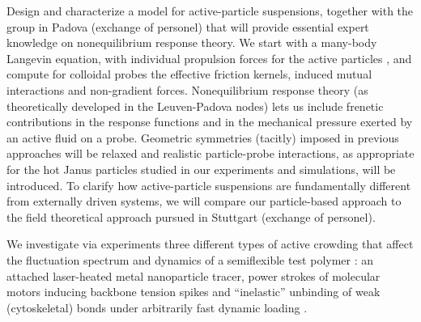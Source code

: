 \begin{workpackage}[id=WPactive,wphases=0-48,
  short=Active Particle Suspensions,%
  title=Probing active particle suspensions with colloids and polymers,
  lead=ULEI,
  ULEIRM=96,UNIPDRM=6,USTUTTRM=2]
\begin{tasklist}

\begin{task}[title=Nonequilibrium equations of state (NEOS),id=task1,lead=ULEI,partners={UNIPD,USTUTT},
wphases={0-48!0.5,24-30,36-38}]
Design and characterize a model for active-particle suspensions, together with the group
in Padova (exchange of personel) that will provide essential expert knowledge on
nonequilibrium response theory.
%
We start with a many-body Langevin equation, with individual propulsion forces for the
active particles \cite{solon-etal:2015}, and compute for colloidal probes the effective
friction kernels, induced mutual interactions and non-gradient forces.
%
Nonequilibrium response theory (as theoretically developed in the Leuven-Padova nodes) lets us include 
frenetic contributions in the response functions \cite{baiesi-wynants:2009} and in the mechanical pressure 
exerted by an active fluid on a probe. 
%
Geometric symmetries (tacitly) imposed in previous approaches will be relaxed and realistic particle-probe interactions, 
as appropriate for the hot Janus particles studied in our experiments and simulations, will be introduced.
%
To clarify how active-particle suspensions are fundamentally different from externally driven systems,
we will compare our particle-based approach to the field theoretical approach pursued in Stuttgart (exchange of personel). 

\end{task}

\begin{task}[title=Active Crowding,id=task2,lead=ULEI,partners={KUL},wphases=0-48!0.5]
We investigate via experiments three different types of active crowding that affect the fluctuation spectrum and dynamics of
a semiflexible test polymer \cite{otto-etal:2013}: an attached laser-heated metal nanoparticle tracer, power strokes of
molecular motors inducing backbone tension spikes and ``inelastic'' \cite{gralka-kroy:2015} unbinding of weak (cytoskeletal)
bonds under arbitrarily fast dynamic loading \cite{bullerjahn-sturm-kroy:2014}.
\end{task}


\end{tasklist}
\end{workpackage}
